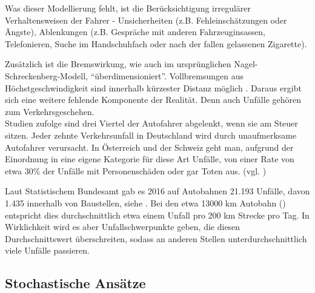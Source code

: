 Was dieser Modellierung fehlt, ist die Berücksichtigung irregulärer Verhaltensweisen der Fahrer - Unsicherheiten (z.B. Fehleinschätzungen oder Ängste), Ablenkungen (z.B. Gespräche mit anderen Fahrzeuginsassen, Telefonieren, Suche im Handschuhfach oder nach der fallen gelassenen Zigarette). 

Zusätzlich ist die Bremswirkung, wie auch im ursprünglichen Nagel-Schreckenberg-Modell, \enquote{über\-di\-men\-sio\-niert}. 
Vollbremsungen aus Höchstgeschwindigkeit sind innerhalb kürzester Distanz möglich \cite{acc-free}.
Daraus ergibt sich eine weitere fehlende Komponente der Realität.
Denn auch Unfälle gehören zum Verkehrsgeschehen. \\
Studien zufolge sind drei Viertel der Autofahrer abgelenkt, wenn sie am Steuer sitzen. 
Jeder zehnte Verkehrsunfall in Deutschland wird durch unaufmerksame Autofahrer verursacht. 
In Österreich und der Schweiz geht man, aufgrund der Einordnung in eine eigene Kategorie für diese Art Unfälle, von einer Rate von etwa 30\% der Unfälle mit Personenschäden oder gar Toten aus. (vgl. \cite{dvr-studie})

Laut Statistischem Bundesamt gab es 2016 auf Autobahnen 21.193 Unfälle, davon 1.435 innerhalb von Baustellen, siehe \cite[S. 94]{unf2016}. %
Bei den etwa 13000 km Autobahn (\cite[S. 607]{autob2016}) %
entspricht dies durchschnittlich etwa einem Unfall pro 200 km Strecke pro Tag. 
In Wirklichkeit wird es aber Unfallschwerpunkte geben, die diesen Durchschnittswert überschreiten, sodass an anderen Stellen unterdurchschnittlich viele Unfälle passieren.






\subsection{Stochastische Ansätze}
\label{sec:stochastic-approaches}

